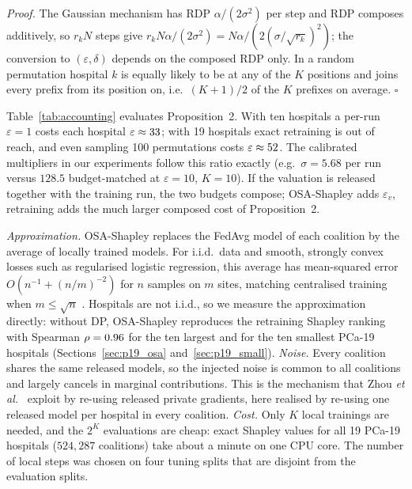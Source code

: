 \documentclass[journal]{IEEEtran}
\begin{document}
\emph{Proof.} The Gaussian mechanism has RDP $\alpha/(2\sigma^2)$ per step and RDP composes additively, so $r_kN$ steps give $r_kN\alpha/(2\sigma^2) = N\alpha/(2(\sigma/\sqrt{r_k})^2)$; the conversion to $(\varepsilon,\delta)$ depends on the composed RDP only. In a random permutation hospital $k$ is equally likely to be at any of the $K$ positions and joins every prefix from its position on, i.e.\ $(K+1)/2$ of the $K$ prefixes on average. $\square$

Table~\ref{tab:accounting} evaluates Proposition~2. With ten hospitals a per-run $\varepsilon=1$ costs each hospital $\varepsilon\approx33$; with 19 hospitals exact retraining is out of reach, and even sampling 100 permutations costs $\varepsilon\approx52$. The calibrated multipliers in our experiments follow this ratio exactly (e.g.\ $\sigma=5.68$ per run versus $128.5$ budget-matched at $\varepsilon=10$, $K=10$). If the valuation is released together with the training run, the two budgets compose; OSA-Shapley adds $\varepsilon_v$, retraining adds the much larger composed cost of Proposition~2.

\emph{Approximation.} OSA-Shapley replaces the FedAvg model of each coalition by the average of locally trained models. For i.i.d.\ data and smooth, strongly convex losses such as regularised logistic regression, this average has mean-squared error $O(n^{-1} + (n/m)^{-2})$ for $n$ samples on $m$ sites, matching centralised training when $m \le \sqrt{n}$ \cite{Zhang2013AVGM}. Hospitals are not i.i.d., so we measure the approximation directly: without DP, OSA-Shapley reproduces the retraining Shapley ranking with Spearman $\rho=0.96$ for the ten largest and \pxSOsaNoDP{} for the ten smallest PCa-19 hospitals (Sections~\ref{sec:p19_osa} and~\ref{sec:p19_small}). \emph{Noise.} Every coalition shares the same released models, so the injected noise is common to all coalitions and largely cancels in marginal contributions. This is the mechanism that Zhou \emph{et al.}\ \cite{Zhou2025Data} exploit by re-using released private gradients, here realised by re-using one released model per hospital in every coalition. \emph{Cost.} Only $K$ local trainings are needed, and the $2^K$ evaluations are cheap: exact Shapley values for all 19 PCa-19 hospitals ($524{,}287$ coalitions) take about a minute on one CPU core. The number of local steps was chosen on four tuning splits that are disjoint from the evaluation splits.
\end{document}
